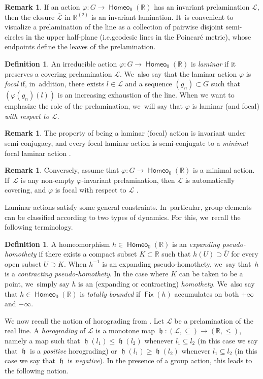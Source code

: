 \documentclass[10pt]{amsart}
\newcommand{\ie}{i.e.}
\theoremstyle{definition}
\newtheorem{dfn}[thm]{Definition}
\newtheorem{rem}[thm]{Remark}
\DeclareMathOperator{\Fix}{\mathsf{Fix}}\let\fix\Fix
\DeclareMathOperator{\homeo}{\mathsf{Homeo}}
\DeclareMathOperator{\hor}{\mathfrak{h}}
\newcommand{\R}{\mathbb{R}}
\newcommand{\Lcal}{\mathcal{L}}
\begin{document}
\begin{rem}
If an action $\varphi \colon G \to \homeo_0(\R)$ has an invariant prelamination $\Lcal$, then the closure $\overline{\mathcal L}$ in $\R^{(2)}$ is an invariant lamination. It~is convenient to visualize a prelamination of the line as a collection of pairwise disjoint semi-circles in the upper half-plane (\ie geodesic lines in the Poincaré metric), whose endpoints define the leaves of the prelamination.
\end{rem}

\begin{dfn}\label{def.lamination}
An irreducible action $\varphi\colon G\to\homeo_0(\R)$ is \emph{laminar} if it preserves a covering prelamination $\Lcal$. We~also say that the laminar action $\varphi$ is \emph{focal} if, in~addition, there exists $l\in\Lcal$ and a sequence $(g_n)\subset G$ such that $(\varphi(g_n)(l))$ is an increasing exhaustion of the line. When we want to emphasize the role of the prelamination, we~will say that $\varphi$ is laminar (and focal) \emph{with respect to $\Lcal$}.
\end{dfn}

\begin{rem}
The property of being a laminar (focal) action is invariant under semi-conjugacy, and every focal laminar action is semi-conjugate to a \emph{minimal} focal laminar action \cite[Prop.\,8.1.14]{BMRT}.
\end{rem}
\begin{rem}\label{r-minimal-implies-focal}
Conversely, assume that $\varphi\colon G\to\homeo_0(\R)$ is a {minimal} action. If~$\Lcal$ is any non-empty $\varphi$-invariant prelamination, then $\Lcal$ is automatically covering, and $\varphi$ is focal with respect to $\Lcal$ \cite[Prop.\,8.1.15]{BMRT}.
\end{rem}

Laminar actions satisfy some general constraints. In~particular, group elements can be classified according to two types of dynamics. For this, we~recall the following terminology.

\begin{dfn} \label{d-expanding-homothety}
A homeomorphism $h\in\homeo_0(\R)$ is an \emph{expanding pseudo-homothety} if there exists a compact subset $K\subset \R$ such that $h(U)\supset \overline{U}$ for every open subset $U\supset K$.
When $h^{-1}$ is an expanding pseudo-homothety, we~say that~$h$ is a \emph{contracting pseudo-homothety}. In the case where $K$ can be taken to be a point, we~simply say $h$ is an (expanding or contracting) \emph{homothety}. We~also say that $h\in \homeo_0(\R)$ is \emph{totally bounded} if $\Fix(h)$ accumulates on both $+\infty$ and $-\infty$.
\end{dfn}
We now recall the notion of horograding from \cite{BMRT}.
Let $\Lcal$ be a prelamination of the real line. A \emph{horograding} of $\Lcal$ is a monotone map $\hor \colon (\Lcal, \subseteq) \to (\R, \leq)$, namely a map such that $\hor(l_1)\leq \hor(l_2)$ whenever $l_1\subseteq l_2$ (in this case we say that $\hor$ is a \emph{positive} horograding) or $\hor(l_1)\geq \hor(l_2)$ whenever $l_1\subseteq l_2$ (in this case we say that $\hor$ is \emph{negative}). In the presence of a group action, this leads to the following notion.
\end{document}

